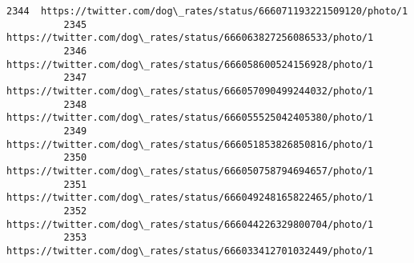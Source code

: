\documentclass[11pt]{article}
\begin{document}
\begin{Verbatim}[commandchars=\\\{\}]
          2344  https://twitter.com/dog\_rates/status/666071193221509120/photo/1                                                                                                                                                                                                   
          2345  https://twitter.com/dog\_rates/status/666063827256086533/photo/1                                                                                                                                                                                                   
          2346  https://twitter.com/dog\_rates/status/666058600524156928/photo/1                                                                                                                                                                                                   
          2347  https://twitter.com/dog\_rates/status/666057090499244032/photo/1                                                                                                                                                                                                   
          2348  https://twitter.com/dog\_rates/status/666055525042405380/photo/1                                                                                                                                                                                                   
          2349  https://twitter.com/dog\_rates/status/666051853826850816/photo/1                                                                                                                                                                                                   
          2350  https://twitter.com/dog\_rates/status/666050758794694657/photo/1                                                                                                                                                                                                   
          2351  https://twitter.com/dog\_rates/status/666049248165822465/photo/1                                                                                                                                                                                                   
          2352  https://twitter.com/dog\_rates/status/666044226329800704/photo/1                                                                                                                                                                                                   
          2353  https://twitter.com/dog\_rates/status/666033412701032449/photo/1                                                                                                                                                                                                   

\end{Verbatim}
\end{document}
